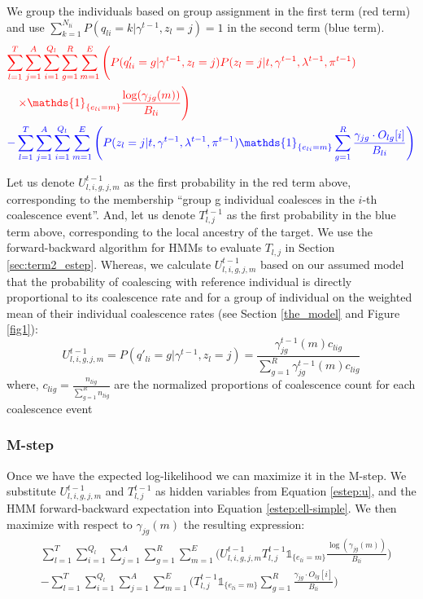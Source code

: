 We group the individuals based on group assignment in the first term (red term) and use $\sum_{k =1}^{N_{li}} P(q_{li} = k \vert \gamma^{t-1}, z_l = j) = 1$ in the second term (blue term). 
\begin{align}
   &\color{red}{\sum_{l = 1}^T \sum_{j = 1}^A \sum_{i = 1}^{Q_l} \sum_{g = 1}^{R} \sum_{m = 1}^E \Bigg( 
       P(q'_{li} = g \vert \gamma^{t-1}, z_l = j) P(z_l = j \vert t, \gamma^{t-1}, \lambda^{t-1}, \pi^{t-1})} \nonumber \\
   &\quad \color{red}{\times \mathds{1}_{\{e_{l i} = m\}} \frac{\log(\gamma_{jg}(m))}{B_{li}} \Bigg)} \nonumber \\
   &\color{blue}{- \sum_{l = 1}^T \sum_{j = 1}^A \sum_{i = 1}^{Q_l} \sum_{m = 1}^E \Bigg( 
       P(z_l = j \vert t, \gamma^{t-1}, \lambda^{t-1}, \pi^{t-1}) \mathds{1}_{\{e_{l i} = m\}}}  \sum_{g=1}^R \frac{\gamma_{jg} \cdot O_{lg}[i]}{B_{li}} \Bigg)
   \label{estep:ell-simple}
\end{align}

Let us denote $U_{l,i,g,j,m}^{t-1}$ as the first probability in the red term above, corresponding to the membership ``group g individual coalesces in the $i$-th coalescence event''. And, let us denote $T_{l,j}^{t-1}$ as the first probability in the blue term above, corresponding to the local ancestry of the target. We use the forward-backward algorithm for HMMs to evaluate $T_{l,j}$ in Section \ref{sec:term2_estep}. Whereas, we calculate $U_{l,i,g,j,m}^{t-1}$ based on our assumed model that the probability of coalescing with reference individual is directly proportional to its coalescence rate and for a group of individual on the weighted mean of their individual coalescence rates (see Section \ref{the_model} and Figure \ref{fig1}):
\begin{equation}
    U_{l,i,g,j,m}^{t-1} = P(q'_{li} = g \vert \gamma^{t-1}, z_l = j) = \frac{\gamma_{jg}^{t-1}(m)c_{lig}}{\sum_{g=1}^R \gamma_{jg}^{t-1}(m)c_{lig}}
    \label{estep:u}
\end{equation}
where, $c_{lig} = \frac{n_{lig}}{\sum_{g=1}^R n_{lig}}$ are the normalized proportions of coalescence count for each coalescence event

\subsubsection{M-step}

Once we have the expected log-likelihood we can maximize it in the M-step. We substitute $U_{l,i,g,j,m}^{t-1}$ and $T_{l,j}^{t-1}$ as hidden variables from Equation \ref{estep:u}, and the HMM forward-backward expectation into Equation \ref{estep:ell-simple}. We then maximize with respect to $\gamma_{jg}(m)$ the resulting expression:
\begin{align}
    &\sum_{l = 1}^T \sum_{i = 1}^{Q_l} \sum_{j = 1}^A \sum_{g = 1}^R \sum_{m = 1}^E \Bigg( 
        U_{l,i,g,j,m}^{t-1} T_{l,j}^{t-1} \mathds{1}_{\{e_{l i} = m\}} \frac{\log(\gamma_{jg}(m))}{B_{li}} \Bigg) \nonumber \\
    &- \sum_{l = 1}^T \sum_{i = 1}^{Q_l} \sum_{j = 1}^A \sum_{m = 1}^E \Bigg( 
        T_{l,j}^{t-1} \mathds{1}_{\{e_{l i} = m\}} \sum_{g = 1}^R \frac{\gamma_{jg} \cdot O_{lg}[i]}{B_{li}} \Bigg)
\end{align}

